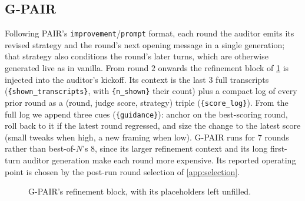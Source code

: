 \documentclass{article}
\theoremstyle{plain}
\theoremstyle{definition}
\theoremstyle{remark}
\begin{document}
\subsection{G-PAIR}\label{app:gpair}
Following PAIR's \texttt{improvement}/\texttt{prompt} format, each round the auditor emits its revised strategy and the round's next opening message in a single generation; that strategy also conditions the round's later turns, which are otherwise generated live as in vanilla. From round $2$ onwards the refinement block of \cref{fig:gpair-prompt} is injected into the auditor's kickoff. Its context is the last $3$ full transcripts (\texttt{\{shown\_transcripts\}}, with \texttt{\{n\_shown\}} their count) plus a compact log of every prior round as a (round, judge score, strategy) triple (\texttt{\{score\_log\}}). From the full log we append three cues (\texttt{\{guidance\}}): anchor on the best-scoring round, roll back to it if the latest round regressed, and size the change to the latest score (small tweaks when high, a new framing when low). G-PAIR runs for $7$ rounds rather than best-of-$N$'s $8$, since its larger refinement context and its long first-turn auditor generation make each round more expensive. Its reported operating point is chosen by the post-run round selection of \cref{app:selection}.

\begin{figure}[htbp]
\centering\small
{}
\caption{G-PAIR's refinement block, with its placeholders left unfilled.}
\label{fig:gpair-prompt}
\end{figure}
\end{document}
